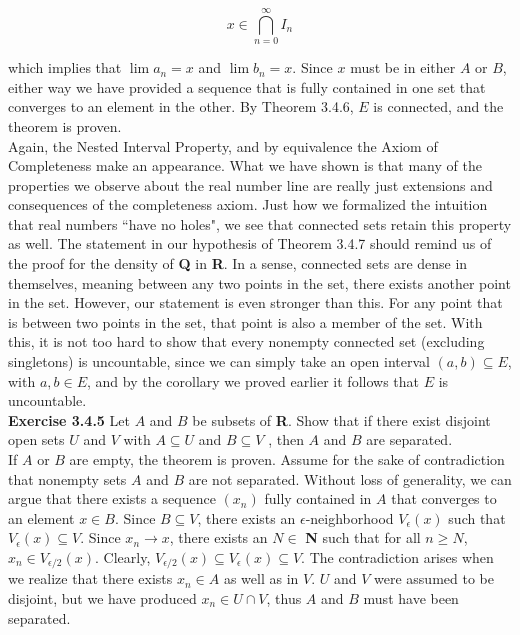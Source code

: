 \documentclass[12pt, letterpaper, twoside]{article}
\begin{document}
$$
    x \in \bigcap_{n=0}^\infty I_n
$$

which implies that $\lim a_n = x$ and $\lim b_n = x$. Since $x$ must be in either $A$ or $B$, either way we have provided a sequence that is fully contained in one set that converges to an element in the other. By Theorem 3.4.6, $E$ is connected, and the theorem is proven. \\

Again, the Nested Interval Property, and by equivalence the Axiom of Completeness make an appearance. What we have shown is that many of the properties we observe about the real number line are really just extensions and consequences of the completeness axiom. Just how we formalized the intuition that real numbers ``have no holes", we see that connected sets retain this property as well. The statement in our hypothesis of Theorem 3.4.7 should remind us of the proof for the density of \textbf{Q} in \textbf{R}. In a sense, connected sets are dense in themselves, meaning between any two points in the set, there exists another point in the set. However, our statement is even stronger than this. For any point that is between two points in the set, that point is also a member of the set. With this, it is not too hard to show that every nonempty connected set (excluding singletons) is uncountable, since we can simply take an open interval $(a, b) \subseteq E$, with  $a,b \in E$, and by the corollary we proved earlier it follows that $E$ is uncountable. \\

\textbf{Exercise 3.4.5} Let $A$ and $B$ be subsets of \textbf{R}. Show that if there exist disjoint
open sets $U$ and $V$ with $A \subseteq U$ and $B \subseteq V$ , then $A$ and $B$ are separated. \\

If $A$ or $B$ are empty, the theorem is proven. Assume for the sake of contradiction that nonempty sets $A$ and $B$ are not separated. Without loss of generality, we can argue that there exists a sequence $(x_n)$ fully contained in $A$ that converges to an element $x \in B$. Since $B \subseteq V$, there exists an $\epsilon$-neighborhood $V_\epsilon (x)$ such that $V_\epsilon (x) \subseteq V$. Since $x_n \to x$, there exists an $N \in$ \textbf{N} such that for all $n \geq N$, $x_n \in V_{\epsilon/2} (x)$. Clearly, $V_{\epsilon/2} (x) \subseteq V_{\epsilon} (x) \subseteq V$. The contradiction arises when we realize that there exists $x_n \in A$ as well as in $V$. $U$ and $V$ were assumed to be disjoint, but we have produced $x_n \in U \cap V$, thus $A$ and $B$ must have been separated. \\
\end{document}
